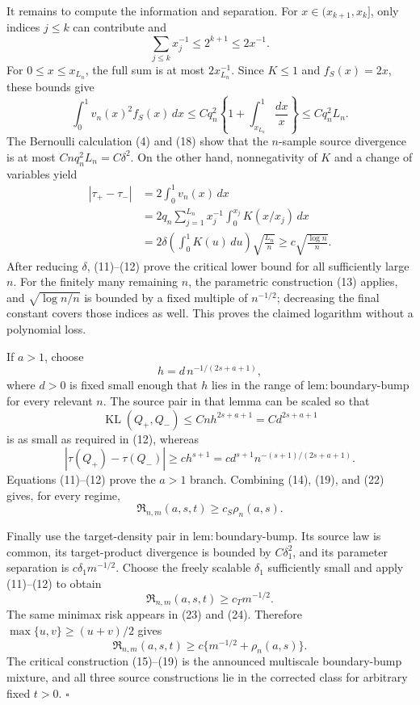 It remains to compute the information and separation. For \(x\in(x_{k+1},x_k]\), only indices \(j\le k\) can contribute and
\[
\sum_{j\le k}x_j^{-1}\le 2^{k+1}\le2x^{-1}.
\]
For \(0\le x\le x_{L_n}\), the full sum is at most \(2x_{L_n}^{-1}\). Since \(K\le1\) and \(f_S(x)=2x\), these bounds give
\[
\int_0^1v_n(x)^2f_S(x)\,dx
\le Cq_n^2\left\{1+\int_{x_{L_n}}^1\frac{dx}{x}\right\}
\le Cq_n^2L_n.
\tag{18}
\]
The Bernoulli calculation (4) and (18) show that the \(n\)-sample source divergence is at most \(Cnq_n^2L_n=C\delta^2\). On the other hand, nonnegativity of \(K\) and a change of variables yield
\[
\begin{aligned}
|\tau_+-\tau_-|
&=2\int_0^1v_n(x)\,dx\\
&=2q_n\sum_{j=1}^{L_n}x_j^{-1}
 \int_0^{x_j}K(x/x_j)\,dx\\
&=2\delta\left(\int_0^1K(u)\,du\right)
 \sqrt{\frac{L_n}{n}}
\ge c\sqrt{\frac{\log n}{n}}.
\end{aligned}
\tag{19}
\]
After reducing \(\delta\), (11)--(12) prove the critical lower bound for all sufficiently large \(n\). For the finitely many remaining \(n\), the parametric construction (13) applies, and \(\sqrt{\log n/n}\) is bounded by a fixed multiple of \(n^{-1/2}\); decreasing the final constant covers those indices as well. This proves the claimed logarithm without a polynomial loss.

If \(a>1\), choose
\[
h=d\,n^{-1/(2s+a+1)},
\tag{20}
\]
where \(d>0\) is fixed small enough that \(h\) lies in the range of \(\mathrm{lem:boundary\text{-}bump}\) for every relevant \(n\). The source pair in that lemma can be scaled so that
\[
\operatorname{KL}(Q_+,Q_-)
\le Cnh^{2s+a+1}=Cd^{2s+a+1}
\tag{21}
\]
is as small as required in (12), whereas
\[
|\tau(Q_+)-\tau(Q_-)|
\ge ch^{s+1}
=cd^{s+1}n^{-(s+1)/(2s+a+1)}.
\tag{22}
\]
Equations (11)--(12) prove the \(a>1\) branch. Combining (14), (19), and (22) gives, for every regime,
\[
\mathfrak R_{n,m}(a,s,t)\ge c_S\rho_n(a,s).
\tag{23}
\]

Finally use the target-density pair in \(\mathrm{lem:boundary\text{-}bump}\). Its source law is common, its target-product divergence is bounded by \(C\delta_1^2\), and its parameter separation is \(c\delta_1m^{-1/2}\). Choose the freely scalable \(\delta_1\) sufficiently small and apply (11)--(12) to obtain
\[
\mathfrak R_{n,m}(a,s,t)\ge c_Tm^{-1/2}.
\tag{24}
\]
The same minimax risk appears in (23) and (24). Therefore \(\max\{u,v\}\ge(u+v)/2\) gives
\[
\mathfrak R_{n,m}(a,s,t)
\ge c\{m^{-1/2}+\rho_n(a,s)\}.
\]
The critical construction (15)--(19) is the announced multiscale boundary-bump mixture, and all three source constructions lie in the corrected class for arbitrary fixed \(t>0\). \(\square\)